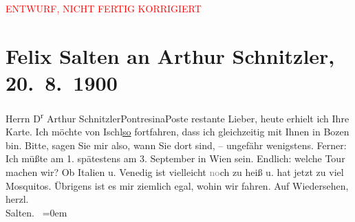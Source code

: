 
\begin{center}
            \textcolor{red}{ENTWURF, NICHT FERTIG KORRIGIERT}
                      \end{center}
            
         \renewcommand{\erwaehnteOrte}{Orte: Bad Ischl, Bozen, Italien, Pontresina, Strobl, Venedig, Wien}
         \renewcommand{\erwaehnteWerke}{}
               \section[Felix Salten an Arthur Schnitzler, 20. 8. 1900]{ Felix Salten an Arthur Schnitzler, 20. 8. 1900}\nopagebreak{}\rehead{ }\begin{ledgroupsized}[t]{13cm}\normalsize\beginnumbering \toendnotes[C]{\smallbreak\pagebreak[2]} 
\pstart{}{\pb}Herrn D\textsuperscript{r} Arthur Schnitzler\pend{}\pstart{}Pontresina\pend{}\pstart{}Poste restante\pend{}{\bigskip}\pstart
           \noindent{}{\pb}Lieber, heute erhielt ich Ihre Karte. Ich möchte von Ischl\uline{so} fortfahren, dass ich gleichzeitig mit Ihnen in Bozen bin. Bitte, sagen Sie mir also, wann Sie
               dort sind, – ungefähr wenigstens. Ferner: Ich müßte am 1. spätestens am
                  3. September in Wien sein.
               Endlich: welche Tour machen wir? Ob Italien u.
                  Venedig ist vielleicht \textcolor{gray}{no}ch
               zu heiß u. hat jetzt zu viel Mosquitos. Übrigens ist es mir ziemlich egal, wohin wir
               fahren. \pend
           \pstart
           Auf Wiedersehen, {\\[\baselineskip]}herzl. {\\[\baselineskip]}\spacefill\mbox{Salten. }\pend
           \leftskip=0em{}
         
         \endnumbering{}\end{ledgroupsized}\begin{anhang}\end{anhang}\newcommand{\dateiname}{L03312}\newcommand{\titel}{Felix Salten an Arthur Schnitzler, 20. 8. 1900}\newcommand{\editorInnen}{Martin Anton Müller und Laura Untner}
      